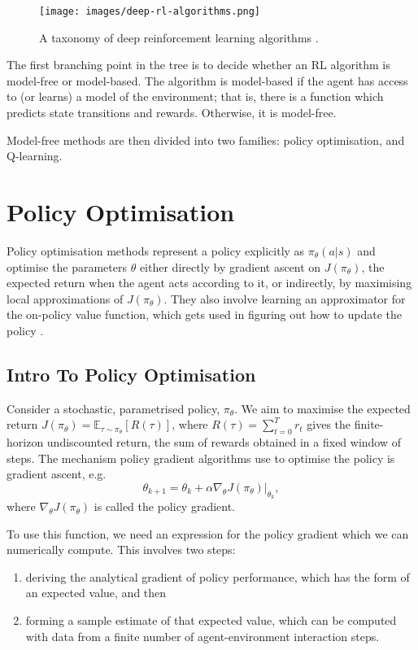 \documentclass{article}
\begin{document}
\begin{figure}[h]
  \centering
  \texttt{[image: images/deep-rl-algorithms.png]}
  \caption{A taxonomy of deep reinforcement learning algorithms \cite{openai_2018}.}
  \label{fig:deep-rl-algorithms}
\end{figure}

The first branching point in the tree is to decide whether an RL algorithm is model-free or model-based. The algorithm is model-based if the agent has access to (or learns) a model of the environment; that is, there is a function which predicts state transitions and rewards. Otherwise, it is model-free.

Model-free methods are then divided into two families: policy optimisation, and Q-learning.

\section{Policy Optimisation}

Policy optimisation methods represent a policy explicitly as $\pi_\theta(a|s)$ and optimise the parameters $\theta$ either directly by gradient ascent on $J(\pi_\theta)$, the expected return when the agent acts according to it, or indirectly, by maximising local approximations of $J(\pi_\theta)$. They also involve learning an approximator for the on-policy value function, which gets used in figuring out how to update the policy \cite{openai_2018}.

\subsection{Intro To Policy Optimisation}

Consider a stochastic, parametrised policy, $\pi_\theta$. We aim to maximise the expected return $J(\pi_\theta) = \mathbb{E}_{\tau \sim \pi_\theta} \left[ R(\tau) \right]$, where $R(\tau) = \sum_{t=0}^Tr_t$ gives the finite-horizon undiscounted return, the sum of rewards obtained in a fixed window of steps. The mechanism policy gradient algorithms use to optimise the policy is gradient ascent, e.g. $$\theta_{k+1} = \theta_k + \alpha \nabla_\theta J(\pi_\theta) |_{\theta_k},$$ where $\nabla_\theta J(\pi_\theta)$ is called the policy gradient.

To use this function, we need an expression for the policy gradient which we can numerically compute. This involves two steps:
\begin{enumerate}
  \item deriving the analytical gradient of policy performance, which has the form of an expected value, and then
  \item forming a sample estimate of that expected value, which can be computed with data from a finite number of agent-environment interaction steps.
\end{enumerate}
\end{document}
